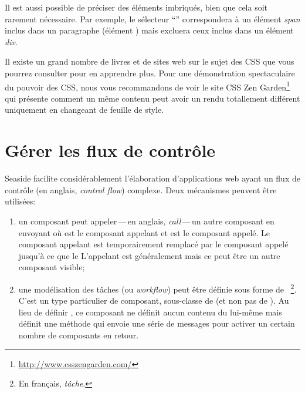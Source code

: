 \documentclass[a4paper,10pt,twoside]{book}
\begin{document}
Il est aussi possible de préciser des éléments imbriqués, bien que
cela soit rarement nécessaire. Par exemple, le sélecteur
``'' correspondera à un élément \emph{span} inclus dans un
paragraphe (élément ) mais excluera ceux inclus dans un élément
\emph{div}.

Il existe un grand nombre de livres et de sites web sur le sujet des
CSS que vous pourrez consulter pour en apprendre plus.
Pour une démonstration spectaculaire du pouvoir des CSS, nous vous
recommandons de voir le site CSS Zen
Garden\footnote{\url{http://www.csszengarden.com/}} qui présente
comment un même contenu peut avoir un rendu totallement différent
uniquement en changeant de feuille de style.

\section{Gérer les flux de contrôle} %

Seaside facilite considérablement l'élaboration d'applications web
ayant un flux de contrôle (en anglais, \emph{control flow}) complexe.
Deux mécanismes peuvent être utilisées:

\begin{enumerate}
  \item un composant peut appeler\,---\,en anglais,
    \emph{call}\,---\,un autre composant en envoyant
où  est le composant appelant et  est le
composant appelé.
Le composant appelant est temporairement remplacé par le composant
appelé jusqu'à ce que le 
L'appelant est généralement  mais ce peut être un autre
composant visible;
  \item une modélisation des tâches (ou \emph{workflow}) peut être définie
    sous forme de ~\footnote{En
      français, \emph{tâche}.}.
    C'est un type particulier de composant, sous-classe de
     (et non pas de ).
Au lieu de définir , ce composant ne définit
aucun contenu du lui-même mais définit une méthode  qui envoie
une série de messages  pour activer un certain nombre de
composants en retour.
\end{enumerate}
\end{document}
